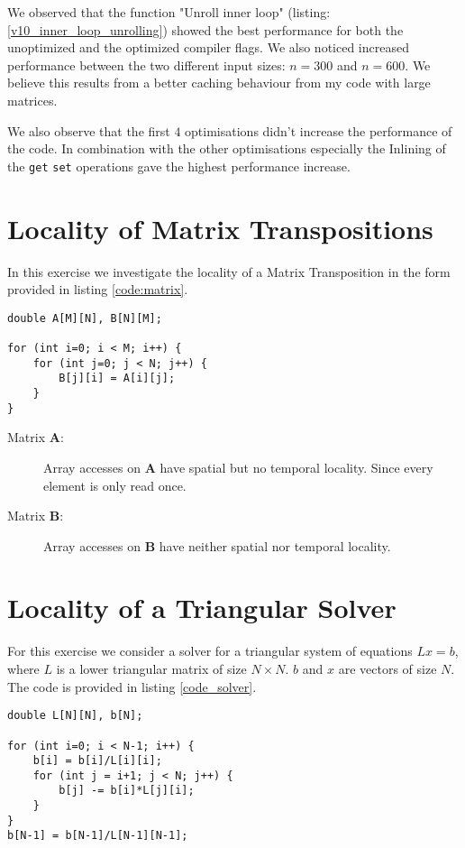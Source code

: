 \documentclass[portrait,a4paper]{article}
\begin{document}
We observed that the function "Unroll inner loop" (listing: \ref{v10_inner_loop_unrolling}) showed the best performance for both the unoptimized and the optimized compiler flags. We also noticed increased performance between the two different input sizes: $n=300$ and $n=600$. We believe this results from a better caching behaviour from my code with large matrices.

We also observe that the first $4$ optimisations didn't increase the performance of the code. In combination with the other optimisations especially the Inlining of the \lstinline{get} \lstinline{set} operations gave the highest performance increase.

\section{Locality of Matrix Transpositions}
In this exercise we investigate the locality of a Matrix Transposition in the form provided in listing \ref{code:matrix}.
\begin{lstlisting}[caption=Matrix transpose code,label=code:matrix]
double A[M][N], B[N][M];

for (int i=0; i < M; i++) {
    for (int j=0; j < N; j++) {
        B[j][i] = A[i][j];
    }
}
\end{lstlisting}

\begin{description}
    \item[Matrix $\mathbf{A}$:] Array accesses on $\mathbf{A}$ have spatial but no temporal locality. Since every element is only read once.
    \item[Matrix $\mathbf{B}$:] Array accesses on $\mathbf{B}$ have neither spatial nor temporal locality.\end{description}

\section{Locality of a Triangular Solver}
For this exercise we consider a solver for a triangular system of equations $Lx=b$, where $L$ is a lower triangular matrix of size $N\times N$. $b$ and $x$ are vectors of size $N$. The code is provided in listing \ref{code_solver}.

\begin{lstlisting}[caption=Code for a Triangular Solver,label=code_solver]
double L[N][N], b[N];

for (int i=0; i < N-1; i++) {
    b[i] = b[i]/L[i][i];
    for (int j = i+1; j < N; j++) {
        b[j] -= b[i]*L[j][i];
    }
}
b[N-1] = b[N-1]/L[N-1][N-1];
\end{lstlisting}
\end{document}
